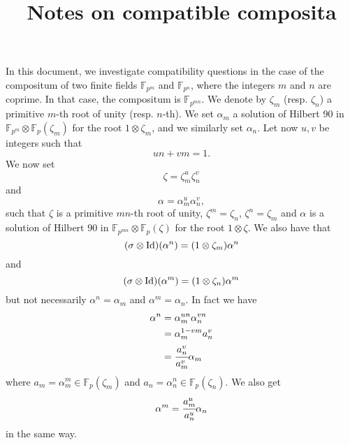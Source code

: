 \documentclass[a4paper,11pt]{article}
\title{Notes on compatible composita}
\author{}
\begin{document}
\maketitle





In this document, we investigate compatibility questions in the case of the
compositum of two finite fields $\mathbb{F}_{p^m}$ and $\mathbb{F}_{p^n}$, where
the integers $m$ and $n$ are coprime. In that case, the compositum is
$\mathbb{F}_{p^{mn}}$. We denote by $\zeta_m$ (resp. $\zeta_n$) a primitive $m$-th 
root of unity (resp. $n$-th). We set $\alpha_m$ a solution of Hilbert 90 in
$\mathbb{F}_{p^m}\otimes\mathbb{F}_{p}(\zeta_m)$ for the root $1\otimes\zeta_m$,
and we similarly set $\alpha_n$. Let now $u, v$ be integers such that
\[
  un+vm = 1.
\]
We now set
\[
  \zeta=\zeta_m^u\zeta_n^v
\]
and 
\[
  \alpha=\alpha_m^u\alpha_n^v,
\]
such that $\zeta$ is a primitive $mn$-th root of unity, $\zeta^m=\zeta_n$,
$\zeta^n=\zeta_m$ and $\alpha$ is a
solution of Hilbert 90 in $\mathbb{F}_{p^{mn}}\otimes\mathbb{F}_{p}(\zeta)$ for
the root $1\otimes\zeta$. We also have that
\[
  (\sigma\otimes\operatorname{Id})(\alpha^n) = (1\otimes\zeta_m)\alpha^n
\]
and
\[
  (\sigma\otimes\operatorname{Id})(\alpha^m) = (1\otimes\zeta_n)\alpha^m
\]
but not necessarily $\alpha^n=\alpha_m$ and $\alpha^m=\alpha_n$. In fact we have 
\begin{align*}
  \alpha^n &= \alpha_m^{un}\alpha_n^{vn} \\
  &= \alpha_m^{1-vm}a_n^v \\
  &= \cfrac{a_n^v}{a_m^v}\alpha_m
\end{align*}
where $a_m=\alpha_m^m\in\mathbb{F}_p(\zeta_m)$ and $a_n =
\alpha_n^n\in\mathbb{F}_p(\zeta_n)$. We also get
\[
  \alpha^m = \cfrac{a_m^u}{a_n^u}\alpha_n
\]
in the same way.
\end{document}
